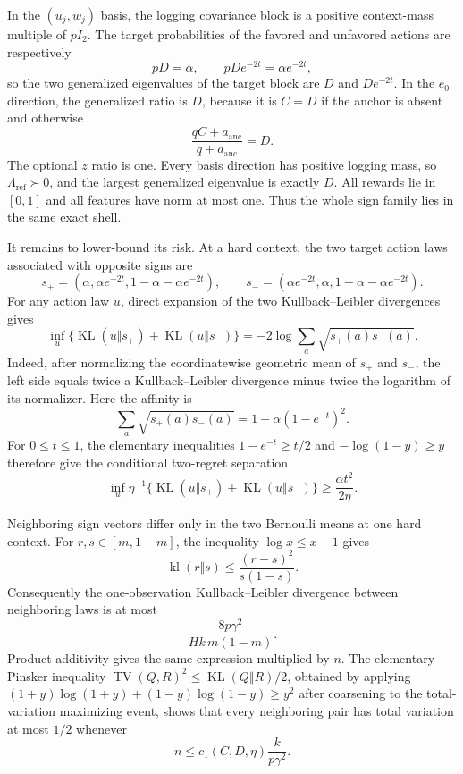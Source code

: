 In the \((u_j,w_j)\) basis, the logging covariance block is a positive context-mass multiple of \(pI_2\). The target probabilities of the favored and unfavored actions are respectively
\[
pD=\alpha,\qquad pDe^{-2t}=\alpha e^{-2t},
\]
so the two generalized eigenvalues of the target block are \(D\) and \(De^{-2t}\). In the \(e_0\) direction, the generalized ratio is \(D\), because it is \(C=D\) if the anchor is absent and otherwise
\[
\frac{qC+a_{\mathrm{anc}}}{q+a_{\mathrm{anc}}}=D.
\]
The optional \(z\) ratio is one. Every basis direction has positive logging mass, so \(\Lambda_{\mathrm{ref}}\succ0\), and the largest generalized eigenvalue is exactly \(D\). All rewards lie in \([0,1]\) and all features have norm at most one. Thus the whole sign family lies in the same exact shell.

It remains to lower-bound its risk. At a hard context, the two target action laws associated with opposite signs are
\[
s_+=(\alpha,\alpha e^{-2t},1-\alpha-\alpha e^{-2t}),
\qquad
s_-=(\alpha e^{-2t},\alpha,1-\alpha-\alpha e^{-2t}).
\]
For any action law \(u\), direct expansion of the two Kullback--Leibler divergences gives
\[
\inf_u\{\operatorname{KL}(u\Vert s_+)+\operatorname{KL}(u\Vert s_-)\}
=-2\log\sum_a\sqrt{s_+(a)s_-(a)}.
\]
Indeed, after normalizing the coordinatewise geometric mean of \(s_+\) and \(s_-\), the left side equals twice a Kullback--Leibler divergence minus twice the logarithm of its normalizer. Here the affinity is
\[
\sum_a\sqrt{s_+(a)s_-(a)}=1-\alpha(1-e^{-t})^2.
\]
For \(0\le t\le1\), the elementary inequalities \(1-e^{-t}\ge t/2\) and \(-\log(1-y)\ge y\) therefore give the conditional two-regret separation
\[
\inf_u\eta^{-1}\{\operatorname{KL}(u\Vert s_+)+\operatorname{KL}(u\Vert s_-)\}
\ge\frac{\alpha t^2}{2\eta}.
\]

Neighboring sign vectors differ only in the two Bernoulli means at one hard context. For \(r,s\in[m,1-m]\), the inequality \(\log x\le x-1\) gives
\[
\operatorname{kl}(r\Vert s)\le\frac{(r-s)^2}{s(1-s)}.
\]
Consequently the one-observation Kullback--Leibler divergence between neighboring laws is at most
\[
\frac{8p\gamma^2}{Hk\,m(1-m)}.
\]
Product additivity gives the same expression multiplied by \(n\). The elementary Pinsker inequality \(\operatorname{TV}(Q,R)^2\le\operatorname{KL}(Q\Vert R)/2\), obtained by applying \((1+y)\log(1+y)+(1-y)\log(1-y)\ge y^2\) after coarsening to the total-variation maximizing event, shows that every neighboring pair has total variation at most \(1/2\) whenever
\[
n\le c_1(C,D,\eta)\frac{k}{p\gamma^2}.
\]

